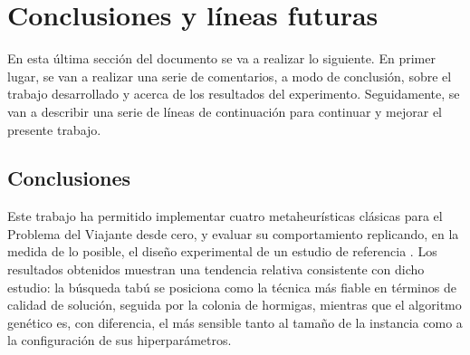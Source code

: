 %
%
%
% 
%
%
%
%

\chapter{Conclusiones y líneas futuras}
\label{cha:conc}

En esta última sección del documento se va a realizar lo siguiente. En primer lugar, se van a realizar una serie de comentarios,
a modo de conclusión, sobre el trabajo desarrollado y acerca de los resultados del experimento. Seguidamente, se van a describir
una serie de líneas de continuación para continuar y mejorar el presente trabajo.

\section{Conclusiones}
\label{sec:conc}

Este trabajo ha permitido implementar cuatro metaheurísticas clásicas para el Problema del Viajante desde cero, y evaluar
su comportamiento replicando, en la medida de lo posible, el diseño experimental de un estudio de referencia \cite{halim2019}. 
Los resultados obtenidos muestran una tendencia relativa consistente con dicho estudio: la búsqueda tabú se posiciona como la 
técnica más fiable en términos de calidad de solución, seguida por la colonia de hormigas, mientras que el algoritmo genético 
es, con diferencia, el más sensible tanto al tamaño de la instancia como a la configuración de sus hiperparámetros.

